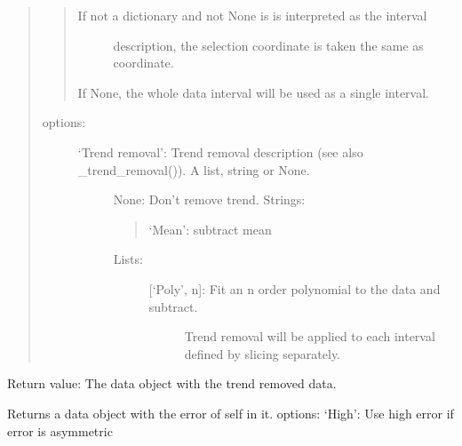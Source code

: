 \documentclass[letterpaper,10pt,english]{sphinxmanual}
\begin{document}
\begin{fulllineitems}
\begin{fulllineitems}
\begin{quote}
\begin{quote}
\begin{description}
\item[{If not a dictionary and not None is is interpreted as the interval}] \leavevmode
description, the selection coordinate is taken the same as
coordinate.

\end{description}

If None, the whole data interval will be used as a single interval.
\end{quote}
\begin{description}
\item[{options:}] \leavevmode\begin{description}
\item[{‘Trend removal’: Trend removal description (see also \_trend\_removal()). A list, string or None.}] \leavevmode
None: Don’t remove trend.
Strings:
\begin{quote}

‘Mean’: subtract mean
\end{quote}
\begin{description}
\item[{Lists:}] \leavevmode\begin{description}
\item[{{[}‘Poly’, n{]}: Fit an n order polynomial to the data and subtract.}] \leavevmode
Trend removal will be applied to each interval defined by slicing
separately.

\end{description}

\end{description}

\end{description}

\end{description}
\end{quote}

Return value: The data object with the trend removed data.

\end{fulllineitems}


\begin{fulllineitems}
\label{\detokenize{data_object:flap.data_object.DataObject.error_value}}
Returns a data object with the error of self in it.
options: ‘High’: Use high error if error is asymmetric
\begin{quote}


\end{quote}
\end{fulllineitems}
\end{fulllineitems}
\end{document}
